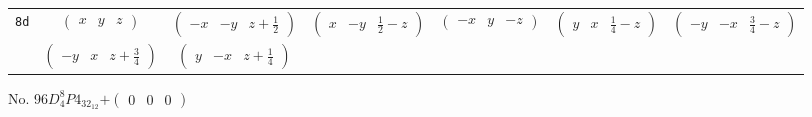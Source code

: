 \documentclass[fleqn,9pt,landscape]{jsarticle}
\begin{document}
\begin{center}
\begin{longtable}{ccccccc}
{\tt 8d} & $ \begin{pmatrix} x & y & z \end{pmatrix} $ & $ \begin{pmatrix} - x & - y & z + \frac{1}{2} \end{pmatrix} $ & $ \begin{pmatrix} x & - y & \frac{1}{2} - z \end{pmatrix} $ & $ \begin{pmatrix} - x & y & - z \end{pmatrix} $ & $ \begin{pmatrix} y & x & \frac{1}{4} - z \end{pmatrix} $ & $ \begin{pmatrix} - y & - x & \frac{3}{4} - z \end{pmatrix} $ \\
& $ \begin{pmatrix} - y & x & z + \frac{3}{4} \end{pmatrix} $ & $ \begin{pmatrix} y & - x & z + \frac{1}{4} \end{pmatrix} $ & $  $ & $  $ & $  $ & $  $ \\
\end{longtable}
\end{center}
\newpage
No. 96\quad$D_{4}^{8}$\quad$P4_32_12$\quad[ tetragonal ]\quad$+\begin{pmatrix} 0 & 0 & 0 \end{pmatrix}$
\end{document}
